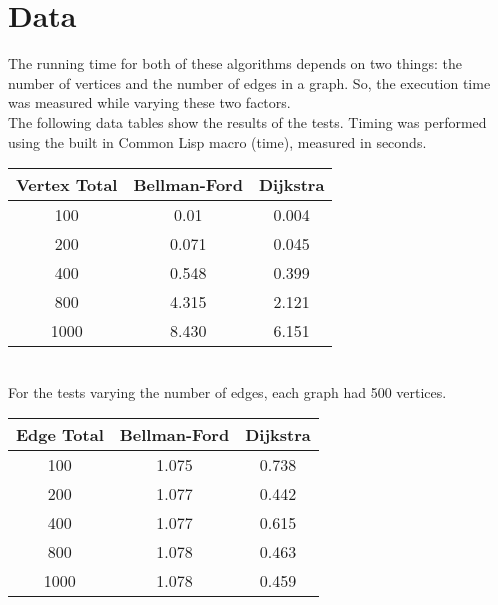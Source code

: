 \documentclass{article}
\begin{document}
  \section*{Data}
The running time for both of these algorithms depends on two things: the number of vertices and the number of edges in a graph. So, the execution time was measured while varying these two factors.\\
The following data tables show the results of the tests. Timing was performed using the built in Common Lisp macro (time), measured in seconds.\\
\begin{tabular}{|c|c|c|}
\hline
Vertex Total & Bellman-Ford & Dijkstra \\
\hline
100 & 0.01 & 0.004 \\
\hline
200 & 0.071 & 0.045 \\
\hline
400 & 0.548 & 0.399 \\
\hline
800 & 4.315 & 2.121 \\
\hline
1000 & 8.430 & 6.151 \\
\hline
\end{tabular}
\\
For the tests varying the number of edges, each graph had 500 vertices.\\
\begin{tabular}{|c|c|c|}
\hline
Edge Total & Bellman-Ford & Dijkstra \\
\hline
100 & 1.075 & 0.738 \\
\hline
200 & 1.077 & 0.442 \\
\hline
400 & 1.077 & 0.615 \\
\hline
800 & 1.078 & 0.463 \\
\hline
1000 & 1.078 & 0.459 \\
\hline
\end{tabular}
\end{document}
